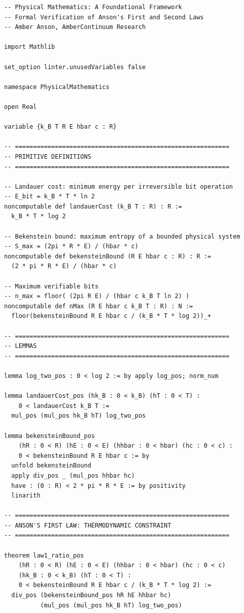 \documentclass[12pt]{article}
\theoremstyle{lawstyle}
\theoremstyle{conjstyle}
\theoremstyle{predstyle}
\begin{document}
\begingroup
\small
\begin{verbatim}
-- Physical Mathematics: A Foundational Framework
-- Formal Verification of Anson's First and Second Laws
-- Amber Anson, AmberContinuum Research

import Mathlib

set_option linter.unusedVariables false

namespace PhysicalMathematics

open Real

variable {k_B T R E hbar c : R}

-- ===========================================================
-- PRIMITIVE DEFINITIONS
-- ===========================================================

-- Landauer cost: minimum energy per irreversible bit operation
-- E_bit = k_B * T * ln 2
noncomputable def landauerCost (k_B T : R) : R :=
  k_B * T * log 2

-- Bekenstein bound: maximum entropy of a bounded physical system
-- S_max = (2pi * R * E) / (hbar * c)
noncomputable def bekensteinBound (R E hbar c : R) : R :=
  (2 * pi * R * E) / (hbar * c)

-- Maximum verifiable bits
-- n_max = floor( (2pi R E) / (hbar c k_B T ln 2) )
noncomputable def nMax (R E hbar c k_B T : R) : N :=
  floor(bekensteinBound R E hbar c / (k_B * T * log 2))_+

-- ===========================================================
-- LEMMAS
-- ===========================================================

lemma log_two_pos : 0 < log 2 := by apply log_pos; norm_num

lemma landauerCost_pos (hk_B : 0 < k_B) (hT : 0 < T) :
    0 < landauerCost k_B T :=
  mul_pos (mul_pos hk_B hT) log_two_pos

lemma bekensteinBound_pos
    (hR : 0 < R) (hE : 0 < E) (hhbar : 0 < hbar) (hc : 0 < c) :
    0 < bekensteinBound R E hbar c := by
  unfold bekensteinBound
  apply div_pos _ (mul_pos hhbar hc)
  have : (0 : R) < 2 * pi * R * E := by positivity
  linarith

-- ===========================================================
-- ANSON'S FIRST LAW: THERMODYNAMIC CONSTRAINT
-- ===========================================================

theorem law1_ratio_pos
    (hR : 0 < R) (hE : 0 < E) (hhbar : 0 < hbar) (hc : 0 < c)
    (hk_B : 0 < k_B) (hT : 0 < T) :
    0 < bekensteinBound R E hbar c / (k_B * T * log 2) :=
  div_pos (bekensteinBound_pos hR hE hhbar hc)
          (mul_pos (mul_pos hk_B hT) log_two_pos)


\end{verbatim}
\end{document}
